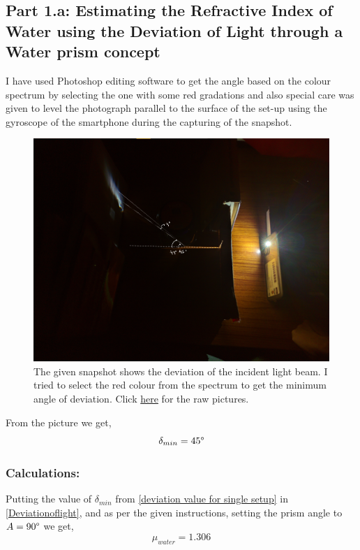 \documentclass[twocolumn,11pt]{article}
\begin{document}
\subsection{Part 1.a: Estimating the Refractive Index of Water using the Deviation of Light through a Water prism concept }
   I have used Photoshop editing software to get the angle based on the colour spectrum by selecting the one with some red gradations and also special care was given to level the photograph parallel to the surface of the set-up using the gyroscope of the smartphone during the capturing of the snapshot.
    
    
    \begin{figure}[H]
        \centering
        \includegraphics[scale =0.3]{red_violet.png}
        \caption{The given snapshot shows the deviation of the incident light beam. I tried to select the red colour from the spectrum to get the minimum angle of deviation. Click \href{https://drive.google.com/drive/folders/1kRDKGAJyG9_05VehqO_25z_MpxRcHcj9?usp=drive_link}{here} for the raw pictures.}
        \label{Angle of deviation _45}
    \end{figure}
From the picture we get,
\begin{equation}
    \label{deviation value for single setup}
    \delta_{min} = 45 \degree
\end{equation}
\subsubsection{Calculations:}
Putting the value of $\delta_{min}$ from \eqref{deviation value for single setup} in \eqref{Deviationoflight}, and as per the given instructions, setting the prism angle to $A = 90\degree$ we get,
\begin{equation}
    \label{Refractive Index from single setup}
    \mu_{water} = 1.306
\end{equation}
\end{document}
